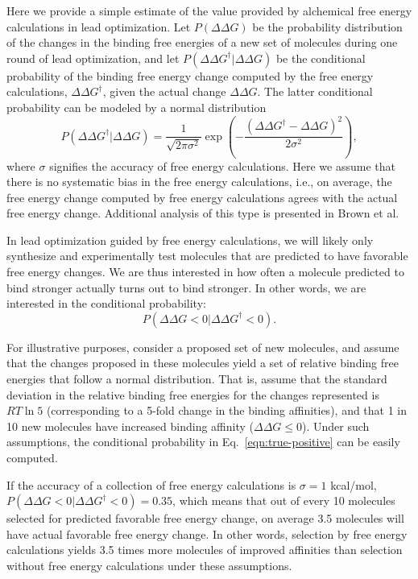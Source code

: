 \documentclass[9pt,bestpractices,pubversion]{livecoms}
\begin{document}
Here we provide a simple estimate of the value provided by alchemical
free energy calculations in lead optimization. Let $P(\Delta\Delta
G)$ be the probability distribution of the changes in the binding free
energies of a new set of molecules during one round of lead
optimization, and let $P(\Delta\Delta G^\dagger|\Delta\Delta G)$ be the
conditional probability of the binding free energy change computed by
the free energy calculations, $\Delta\Delta G^\dagger$, given the actual
change $\Delta\Delta G$. The latter conditional probability can be modeled
by a normal distribution
\begin{equation}
  P(\Delta\Delta G^\dagger|\Delta\Delta G) = \frac{1}{\sqrt{2\pi\sigma^2}}
  \exp\left(-\frac{(\Delta\Delta G^\dagger - \Delta\Delta G)^2}{2\sigma^2}\right),
  \label{eqn:free-energy-distribution}
\end{equation}
where $\sigma$ signifies the accuracy of free energy calculations.
Here we assume that there is no systematic bias in the free energy
calculations, i.e., on average, the free energy change computed by
free energy calculations agrees with the actual free energy change. Additional analysis of this type is presented in Brown et al.~\cite{brown2010free}

In lead optimization guided by free energy calculations, we will likely only
synthesize and experimentally test molecules that are predicted to
have favorable free energy changes. We are thus interested in how
often a molecule predicted to bind stronger actually turns out to
bind stronger. In other words, we are interested in the conditional
probability:
\begin{equation}
  P(\Delta\Delta G<0|\Delta\Delta G^\dagger<0).
  \label{eqn:true-positive}
\end{equation}

For illustrative purposes, consider a proposed set of new molecules, and assume that the changes proposed in these molecules yield a set of relative binding free energies that follow a normal
distribution. That is, assume that the standard deviation in the relative binding free energies for the changes represented is $RT\ln 5$
(corresponding to a 5-fold change in the binding affinities), and that
1 in 10 new molecules have increased binding affinity ($\Delta\Delta G
\leq 0$). Under such assumptions, the conditional probability in
Eq.~\ref{eqn:true-positive} can be easily computed. 

If the accuracy of a collection of free energy calculations is $\sigma = 1$ kcal/mol, $P(\Delta\Delta
G<0|\Delta\Delta G^\dagger<0) = 0.35$, which means that out of every
10 molecules selected for predicted favorable free energy change, on
average 3.5 molecules will have actual favorable free energy change.
In other words, selection by free energy calculations yields 3.5 times
more molecules of improved affinities than selection without free
energy calculations under these assumptions.
  
\end{document}
